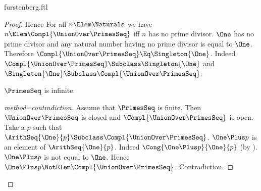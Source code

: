 \documentclass{stex}
\begin{document}
\begin{smodule}{furstenberg.ftl}
\begin{forthel}
\begin{proof}
    Hence For all $n \Elem \Naturals$ we have $n \Elem \Compl{\UnionOver \PrimesSeq}$ iff
    $n$ has no prime divisor.
    $\One$ has no prime divisor and any natural number having no prime
    divisor is equal to $\One$.
    Therefore $\Compl{\UnionOver \PrimesSeq} \Eq \Singleton{\One}$.
    Indeed $\Compl{\UnionOver \PrimesSeq} \Subclass \Singleton{\One}$ and $\Singleton{\One}
    \Subclass \Compl{\UnionOver \PrimesSeq}$.

    $\PrimesSeq$ is infinite.
    \begin{proof}[method=contradiction]
      Assume that $\PrimesSeq$ is finite.
      Then $\UnionOver \PrimesSeq$ is closed and $\Compl{\UnionOver \PrimesSeq}$ is open.
      Take a $p$ such that $\ArithSeq{\One}{p} \Subclass \Compl{\UnionOver \PrimesSeq}$.
      $\One \Plus p$ is an element of $\ArithSeq{\One}{p}$.
      Indeed $\Cong{\One \Plus p}{\One}{p}$
      (by ).
      $\One \Plus p$ is not equal to $\One$.
      Hence $\One \Plus p \NotElem \Compl{\UnionOver \PrimesSeq}$.
      Contradiction.
    \end{proof}
  \end{proof}
\end{forthel}

\printbibliography
{}

\end{smodule}
\end{document}
